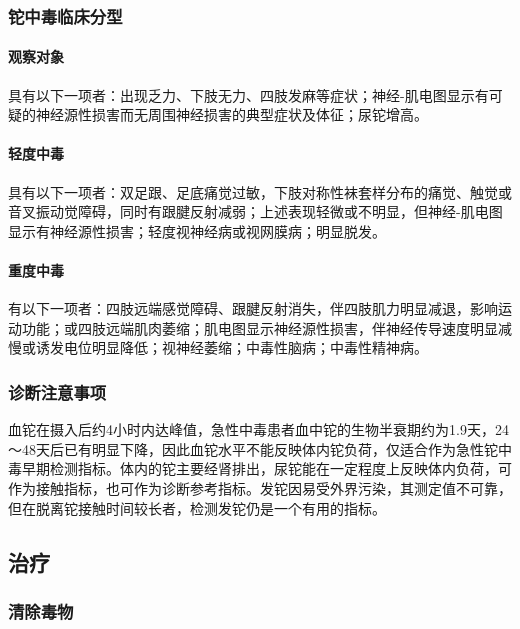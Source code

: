 \subsubsection{铊中毒临床分型}

\paragraph{观察对象}

具有以下一项者：出现乏力、下肢无力、四肢发麻等症状；神经-肌电图显示有可疑的神经源性损害而无周围神经损害的典型症状及体征；尿铊增高。

\paragraph{轻度中毒}

具有以下一项者：双足跟、足底痛觉过敏，下肢对称性袜套样分布的痛觉、触觉或音叉振动觉障碍，同时有跟腱反射减弱；上述表现轻微或不明显，但神经-肌电图显示有神经源性损害；轻度视神经病或视网膜病；明显脱发。

\paragraph{重度中毒}

有以下一项者：四肢远端感觉障碍、跟腱反射消失，伴四肢肌力明显减退，影响运动功能；或四肢远端肌肉萎缩；肌电图显示神经源性损害，伴神经传导速度明显减慢或诱发电位明显降低；视神经萎缩；中毒性脑病；中毒性精神病。

\subsubsection{诊断注意事项}

血铊在摄入后约4小时内达峰值，急性中毒患者血中铊的生物半衰期约为1.9天，24～48天后已有明显下降，因此血铊水平不能反映体内铊负荷，仅适合作为急性铊中毒早期检测指标。体内的铊主要经肾排出，尿铊能在一定程度上反映体内负荷，可作为接触指标，也可作为诊断参考指标。发铊因易受外界污染，其测定值不可靠，但在脱离铊接触时间较长者，检测发铊仍是一个有用的指标。

\subsection{治疗}

\subsubsection{清除毒物}

